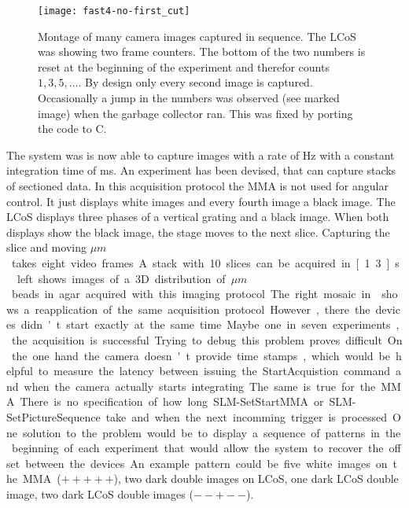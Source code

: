 \begin{figure}[!hbt]
  \centering
  \texttt{[image: fast4-no-first\_cut]}
  \caption{Montage of many camera images captured in sequence. The
    LCoS was showing two frame counters. The bottom of the two numbers
    is reset at the beginning of the experiment and therefor counts
    $1,3,5,\ldots$. By design only every second image is
    captured. Occasionally a jump in the numbers was observed (see
    marked image) when the garbage collector ran. This was fixed by
    porting the code to C.}
  \label{fig:fast4-no-first_cut}
\end{figure}

The system was is now able to capture images with a rate of
\unit[30]{Hz} with a constant integration time of \unit[16]{ms}.  An
experiment has been devised, that can capture stacks of sectioned
data. In this acquisition protocol the MMA is not used for angular
control. It just displays white images and every fourth image a black
image. The LCoS displays three phases of a vertical grating and a
black image. When both displays show the black image, the stage moves
to the next slice. Capturing the slice and moving \unit[1]{$\mu m$}
takes eight video frames. A stack with 10 slices can be acquired in
\unit[1.3]{s}. ~left shows images of a 3D
distribution of \unit[2]{$\mu m$} beads in agar acquired with this
imaging protocol.

The right mosaic in  shows a reapplication of
the same acquisition protocol. However, there the devices didn't start
exactly at the same time. Maybe one in seven experiments, the
acquisition is successful. Trying to debug this problem proves
difficult.

On the one hand the camera doesn't provide time stamps, which would be
helpful to measure the latency between issuing the
\textsf{StartAcquistion} command and when the camera actually starts
integrating.  The same is true for the MMA. There is no specification
of how long \textsf{SLM-SetStartMMA} or
\textsf{SLM-SetPictureSequence} take and when the next incomming
trigger is processed.

One solution to the problem would be to display a sequence of patterns
in the beginning of each experiment that would allow the system to
recover the offset between the devices. An example pattern could be
five white images on the MMA ($+++++$), two dark double images on
LCoS, one dark LCoS double image, two dark LCoS double images ($--+--$).

